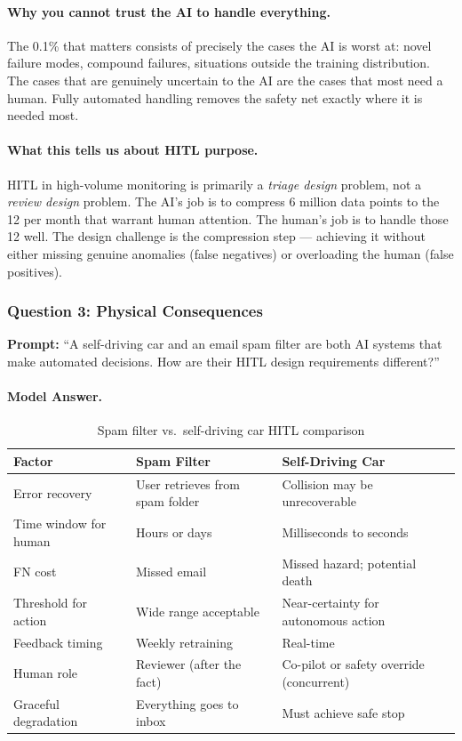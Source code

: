 \paragraph{Why you cannot trust the AI to handle everything.}

The 0.1\% that matters consists of precisely the cases the AI is worst at: novel failure modes, compound failures, situations outside the training distribution. The cases that are genuinely uncertain to the AI are the cases that most need a human. Fully automated handling removes the safety net exactly where it is needed most.

\paragraph{What this tells us about HITL purpose.}

HITL in high-volume monitoring is primarily a \emph{triage design} problem, not a \emph{review design} problem. The AI's job is to compress 6 million data points to the 12 per month that warrant human attention. The human's job is to handle those 12 well. The design challenge is the compression step --- achieving it without either missing genuine anomalies (false negatives) or overloading the human (false positives).

\subsubsection{Question 3: Physical Consequences}

\textbf{Prompt:} ``A self-driving car and an email spam filter are both AI systems that make automated decisions. How are their HITL design requirements different?''

\paragraph{Model Answer.}

\begin{table}[htbp]
\caption{Spam filter vs.\ self-driving car HITL comparison}
\label{tab:spam-vs-car}
\centering
\begin{tabular}{@{}p{3cm}p{4cm}p{4.5cm}@{}}
\toprule
\textbf{Factor} & \textbf{Spam Filter} & \textbf{Self-Driving Car} \\
\midrule
Error recovery & User retrieves from spam folder & Collision may be unrecoverable \\
Time window for human & Hours or days & Milliseconds to seconds \\
FN cost & Missed email & Missed hazard; potential death \\
Threshold for action & Wide range acceptable & Near-certainty for autonomous action \\
Feedback timing & Weekly retraining & Real-time \\
Human role & Reviewer (after the fact) & Co-pilot or safety override (concurrent) \\
Graceful degradation & Everything goes to inbox & Must achieve safe stop \\
\bottomrule
\end{tabular}
\end{table}

